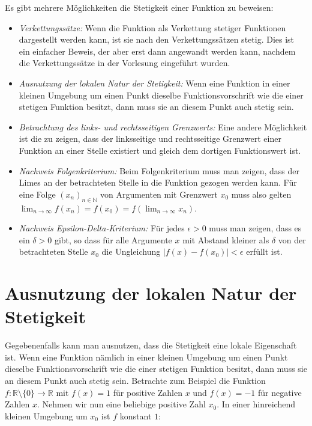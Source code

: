 \documentclass[fontsize=9pt,
               parskip=half-,
               DIV=14,
               listof=chapterentry,
               tocflat]{scrbook}
\begin{document}
Es gibt mehrere Möglichkeiten die Stetigkeit einer Funktion zu beweisen:

\begin{itemize}
\item \emph{Verkettungssätze:} Wenn die Funktion als Verkettung stetiger Funktionen dargestellt werden kann, ist sie nach den Verkettungssätzen stetig. Dies ist ein einfacher Beweis, der aber erst dann angewandt werden kann, nachdem die Verkettungssätze in der Vorlesung eingeführt wurden.
\item \emph{Ausnutzung der lokalen Natur der Stetigkeit:} Wenn eine Funktion in einer kleinen Umgebung um einen Punkt dieselbe Funktionsvorschrift wie die einer stetigen Funktion besitzt, dann muss sie an diesem Punkt auch stetig sein.
\item \emph{Betrachtung des links- und rechtsseitigen Grenzwerts:} Eine andere Möglichkeit ist die zu zeigen, dass der linksseitige und rechtsseitige Grenzwert einer Funktion an einer Stelle existiert und gleich dem dortigen Funktionswert ist.
\item \emph{Nachweis Folgenkriterium:} Beim Folgenkriterium muss man zeigen, dass der Limes an der betrachteten Stelle in die Funktion gezogen werden kann. Für eine Folge $(x_{n})_{n\in \mathbb {N} }$ von Argumenten mit Grenzwert $x_{0}$ muss also gelten $\lim _{n\to \infty }f(x_{n})=f(x_{0})=f\left(\lim _{n\to \infty }x_{n}\right)$.
\item \emph{Nachweis Epsilon-Delta-Kriterium:} Für jedes $\epsilon >0$ muss man zeigen, dass es ein $\delta >0$ gibt, so dass für alle Argumente $x$ mit Abstand kleiner als $\delta $ von der betrachteten Stelle $x_{0}$ die Ungleichung $|f(x)-f(x_{0})|<\epsilon $ erfüllt ist.
\end{itemize}

\section{Ausnutzung der lokalen Natur der Stetigkeit}

Gegebenenfalls kann man ausnutzen, dass die Stetigkeit eine lokale Eigenschaft ist. Wenn eine Funktion nämlich in einer kleinen Umgebung um einen Punkt dieselbe Funktionsvorschrift wie die einer stetigen Funktion besitzt, dann muss sie an diesem Punkt auch stetig sein. Betrachte zum Beispiel die Funktion $f:\mathbb {R} \setminus \{0\}\to \mathbb {R} $ mit $f(x)=1$ für positive Zahlen $x$ und $f(x)=-1$ für negative Zahlen $x$. Nehmen wir nun eine beliebige positive Zahl $x_{0}$. In einer hinreichend kleinen Umgebung um $x_{0}$ ist $f$ konstant $1$:
\end{document}
